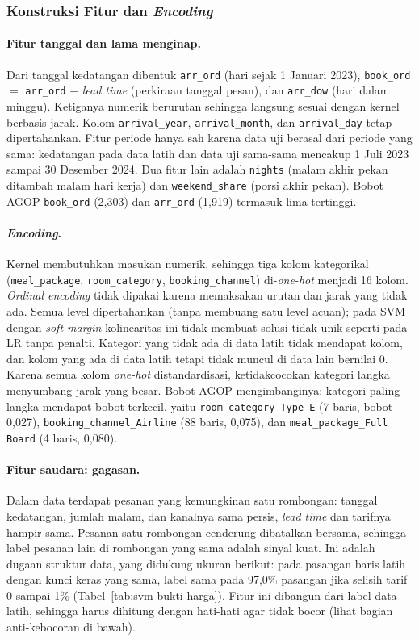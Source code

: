 \subsubsection{Konstruksi Fitur dan \textit{Encoding}}
\paragraph{Fitur tanggal dan lama menginap.} Dari tanggal kedatangan dibentuk \texttt{arr\_ord} (hari sejak 1 Januari 2023), \texttt{book\_ord} $=$ \texttt{arr\_ord} $-$ \textit{lead time} (perkiraan tanggal pesan), dan \texttt{arr\_dow} (hari dalam minggu). Ketiganya numerik berurutan sehingga langsung sesuai dengan kernel berbasis jarak. Kolom \texttt{arrival\_year}, \texttt{arrival\_month}, dan \texttt{arrival\_day} tetap dipertahankan. Fitur periode hanya sah karena data uji berasal dari periode yang sama: kedatangan pada data latih dan data uji sama-sama mencakup 1 Juli 2023 sampai 30 Desember 2024. Dua fitur lain adalah \texttt{nights} (malam akhir pekan ditambah malam hari kerja) dan \texttt{weekend\_share} (porsi akhir pekan). Bobot AGOP \texttt{book\_ord} (2,303) dan \texttt{arr\_ord} (1,919) termasuk lima tertinggi.

\paragraph{\textit{Encoding}.} Kernel membutuhkan masukan numerik, sehingga tiga kolom kategorikal (\texttt{meal\_package}, \texttt{room\_category}, \texttt{booking\_channel}) di-\textit{one-hot} menjadi 16 kolom. \textit{Ordinal encoding} tidak dipakai karena memaksakan urutan dan jarak yang tidak ada. Semua level dipertahankan (tanpa membuang satu level acuan); pada SVM dengan \textit{soft margin} kolinearitas ini tidak membuat solusi tidak unik seperti pada LR tanpa penalti. Kategori yang tidak ada di data latih tidak mendapat kolom, dan kolom yang ada di data latih tetapi tidak muncul di data lain bernilai 0. Karena semua kolom \textit{one-hot} distandardisasi, ketidakcocokan kategori langka menyumbang jarak yang besar. Bobot AGOP mengimbanginya: kategori paling langka mendapat bobot terkecil, yaitu \texttt{room\_category\_Type E} (7 baris, bobot 0,027), \texttt{booking\_channel\_Airline} (88 baris, 0,075), dan \texttt{meal\_package\_Full Board} (4 baris, 0,080).

\paragraph{Fitur saudara: gagasan.} Dalam data terdapat pesanan yang kemungkinan satu rombongan: tanggal kedatangan, jumlah malam, dan kanalnya sama persis, \textit{lead time} dan tarifnya hampir sama. Pesanan satu rombongan cenderung dibatalkan bersama, sehingga label pesanan lain di rombongan yang sama adalah sinyal kuat. Ini adalah dugaan struktur data, yang didukung ukuran berikut: pada pasangan baris latih dengan kunci keras yang sama, label sama pada 97,0\% pasangan jika selisih tarif 0 sampai 1\% (Tabel~\ref{tab:svm-bukti-harga}). Fitur ini dibangun dari label data latih, sehingga harus dihitung dengan hati-hati agar tidak bocor (lihat bagian anti-kebocoran di bawah).

